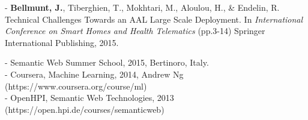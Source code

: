 \documentclass[paper=a4,fontsize=11pt]{temp} %
\begin{document}
\begin{minipage}{0.88\linewidth}
  - \textbf{Bellmunt, J.}, Tiberghien, T., Mokhtari, M., Aloulou, H., \& Endelin, R. Technical Challenges Towards an AAL Large Scale Deployment. In \textit{International Conference on Smart Homes and Health Telematics} (pp.3-14) Springer International Publishing, 2015.\\

\textbf{\color{subheadings}{COURSES}}
\vspace{1ex}

- Semantic Web Summer School, 2015, Bertinoro, Italy.\\
- Coursera, Machine Learning, 2014, Andrew Ng (https://www.coursera.org/course/ml) \\
- OpenHPI, Semantic Web Technologies, 2013 (https://open.hpi.de/courses/semanticweb)
 \end{minipage} 


\sepspace





\sepspace
\end{document}
